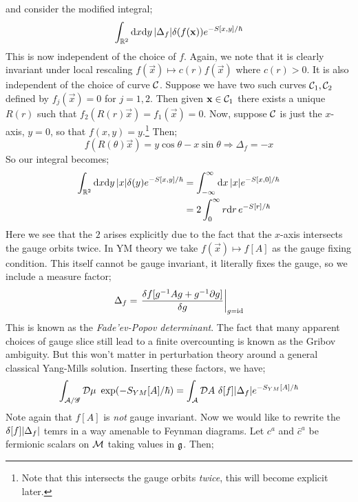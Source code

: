 and consider the modified integral;
\begin{equation*}
\int_{\RR^2}{\ud x \upd{y}\abs{\Delta_f}\delta\left(f(\vec{x})\right)e^{-S[x, y]/\hbar}}
\end{equation*}
This is now independent of the choice of $f$. Again, we note that it is clearly invariant under local rescaling $f(\vec{x}) \mapsto c(r)f(\vec{x})$ where $c(r) > 0$. It is also independent of the choice of curve $\mathcal{C}$. Suppose we have two such curves $\mathcal{C}_1, \mathcal{C}_2$ defined by $f_j(\vec{x}) = 0$ for $j = 1,2$. Then given $\mathbf{x} \in \mathcal{C}_1$ there exists a unique $R(r)$ such that $f_2\left(R(r)\vec{x}\right) = f_1(\vec{x}) = 0$. Now, suppose $\mathcal{C}$ is just the $x$-axis, $y = 0$, so that $f(x, y) = y$.\footnote{Note that this intersects the gauge orbits \emph{twice}, this will become explicit later.} Then;
\begin{equation*}
f\left(R(\theta)\vec{x}\right) = y\cos\theta - x\sin \theta \Rightarrow \Delta_f = -x
\end{equation*}
So our integral becomes;
\begin{align*}
\int_{\RR^2}{\ud x \upd{y}\abs{x}\delta(y) e^{-S[x, y]/\hbar}} &= \int_{-\infty}^{\infty}{\upd{x}\abs{x}e^{-S[x,0]/\hbar}} \\
&= 2\int_0^{\infty}{r\upd{r}e^{-S[r]/\hbar}}
\end{align*}
Here we see that the $2$ arises explicitly due to the fact that the $x$-axis intersects the gauge orbits twice. In YM theory we take $f(\vec{x}) \mapsto f[A]$ as the gauge fixing condition. This itself cannot be gauge invariant, it literally fixes the gauge, so we include a measure factor;
\begin{equation}
\Delta_f = \left.\frac{\delta f[g^{-1}Ag + g^{-1}\del g]}{\delta g}\right|_{g = \text{id}}
\end{equation}
This is known as the \emph{Fade'ev-Popov determinant}. The fact that many apparent choices of gauge slice still lead to a finite overcounting is known as the Gribov ambiguity. But this won't matter in perturbation theory around a general classical Yang-Mills solution. Inserting these factors, we have;
\begin{equation}
\int_{\mathcal{A}/\group}{\mD \mu \,\, \exp(-S_{YM}[A]/\hbar)} = \int_{\mathcal{A}}{\mD A \,\, \delta[f] \abs{\Delta_f}e^{-S_{YM}[A]/\hbar} }
\end{equation}
Note again that $f[A]$ is \emph{not} gauge invariant. Now we would like to rewrite the $\delta[f]\abs{\Delta_f}$ temrs in a way amenable to Feynman diagrams. Let $c^a$ and $\bar{c}^a$ be fermionic scalars on $\mathcal{M}$ taking values in $\mathfrak{g}$. Then;
